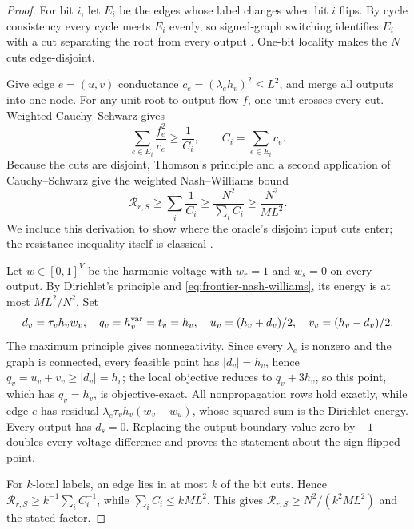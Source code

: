 \begin{proof}
For bit \(i\), let \(E_i\) be the edges whose label changes when bit
\(i\) flips.  By cycle consistency every cycle meets \(E_i\) evenly, so signed-graph switching identifies \(E_i\) with a cut
separating the root from every output
\cite{harary1953-balance-signed-graph,
zaslavsky2013-matrices-signed-simple-graphs}.  One-bit locality makes the
\(N\) cuts edge-disjoint.

Give edge \(e=(u,v)\) conductance
\(c_e=(\lambda_eh_v)^2\leq L^2\), and merge all outputs into one node.  For any
unit root-to-output flow \(f\), one unit crosses every cut.  Weighted
Cauchy--Schwarz gives
\[
 \sum_{e\in E_i}\frac{f_e^2}{c_e}\geq\frac1{C_i},
 \qquad C_i=\sum_{e\in E_i}c_e.
\]
Because the cuts are disjoint, Thomson's principle and a second application
of Cauchy--Schwarz give the weighted Nash--Williams bound
\begin{equation}
 \mathcal R_{r,S}\geq\sum_i\frac1{C_i}
 \geq\frac{N^2}{\sum_iC_i}
 \geq\frac{N^2}{ML^2}.
 \label{eq:frontier-nash-williams}
\end{equation}
We include this derivation to show where the oracle's disjoint input cuts
enter; the resistance inequality itself is classical
\cite{nashwilliams1959-random-walk-electric-currents}.

Let \(w\in[0,1]^V\) be the harmonic voltage with \(w_r=1\) and \(w_s=0\)
on every output.  By Dirichlet's principle and
\eqref{eq:frontier-nash-williams}, its energy is at most \(ML^2/N^2\).  Set
\[
 d_v=\tau_vh_vw_v,\quad q_v=h_v^{\rm var}=t_v=h_v,
 \quad u_v=(h_v+d_v)/2,\quad v_v=(h_v-d_v)/2.
\]
The maximum principle gives nonnegativity.  Since every $\lambda_e$ is
nonzero and the graph is connected, every feasible point has $|d_v|=h_v$,
hence $q_v=u_v+v_v\ge|d_v|=h_v$; the local objective reduces to $q_v+3h_v$,
so this point, which has $q_v=h_v$, is objective-exact.  All nonpropagation
rows hold exactly, while edge \(e\) has residual
\(\lambda_e\tau_vh_v(w_v-w_u)\), whose squared sum is the Dirichlet
energy.  Every output has \(d_s=0\).
Replacing the output boundary value zero by \(-1\) doubles every voltage
difference and proves the statement about the sign-flipped point.

For \(k\)-local labels, an edge lies in at most \(k\) of the bit cuts.  Hence
\(\mathcal R_{r,S}\geq k^{-1}\sum_iC_i^{-1}\), while
\(\sum_iC_i\leq kML^2\).  This gives
\(\mathcal R_{r,S}\geq N^2/(k^2ML^2)\) and the stated factor.
\end{proof}

